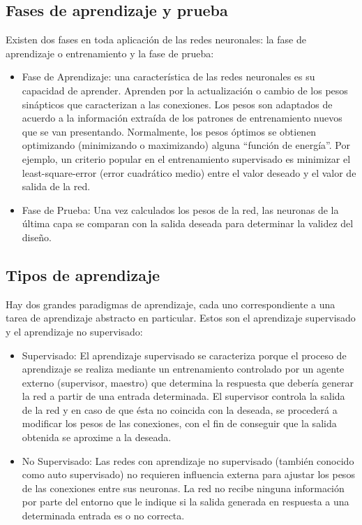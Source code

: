 \subsection{Fases de aprendizaje y prueba}

Existen dos fases en toda aplicación de las redes neuronales: la fase de aprendizaje o entrenamiento y la fase de prueba:
\begin{itemize}
\item Fase de Aprendizaje: una característica de las redes neuronales es su capacidad de aprender. Aprenden por la actualización o cambio de los pesos sinápticos que caracterizan a las conexiones. Los pesos son adaptados de acuerdo a la información extraída de los patrones de entrenamiento nuevos que se van presentando. Normalmente, los pesos óptimos se obtienen optimizando (minimizando o maximizando) alguna “función de energía”. Por ejemplo, un criterio popular en el entrenamiento supervisado es minimizar el least-square-error (error cuadrático medio) entre el valor deseado y el valor de salida de la red.
\item Fase de Prueba: Una vez calculados los pesos de la red, las neuronas de la última capa se comparan con la salida deseada para determinar la validez del diseño.
\end{itemize}

\subsection{Tipos de aprendizaje}
Hay dos grandes paradigmas de aprendizaje, cada uno correspondiente a una tarea de aprendizaje abstracto en particular. Estos son el aprendizaje supervisado y el aprendizaje no supervisado:
\begin{itemize}
    \item Supervisado: El aprendizaje supervisado se caracteriza porque el proceso de aprendizaje se realiza mediante un entrenamiento controlado por un agente externo (supervisor, maestro) que determina la respuesta que debería generar la red a partir de una entrada determinada. El supervisor controla la salida de la red y en caso de que ésta no coincida con la deseada, se procederá a modificar los pesos de las conexiones, con el fin de conseguir que la salida obtenida se aproxime a la deseada.
    \item No Supervisado: Las redes con aprendizaje no supervisado (también conocido como auto supervisado) no requieren influencia externa para ajustar los pesos de las conexiones entre sus neuronas. La red no recibe ninguna información por parte del entorno que le indique si la salida generada en respuesta a una determinada entrada es o no correcta.
\end{itemize}


